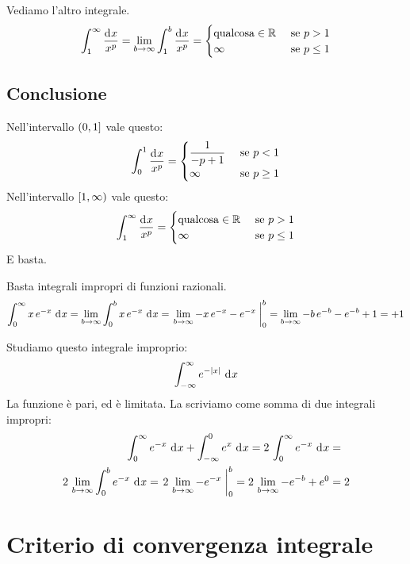 Vediamo l'altro integrale.
\[
\int_{1}^{\infty} \frac{\diff x}{x^p} =
\lim_{b \to \infty} \int_{1}^{b} \frac{\diff x}{x^p} = 
\begin{cases}
\text{qualcosa} \in \reals & \text{ se } p > 1 \\
\infty & \text{ se } p \le 1
\end{cases}
\]

\subsection{Conclusione}

Nell'intervallo $\left( {0}, {1} \right]$ vale questo:
\[
\int_{0}^{1} \frac{\diff x}{x^p} = 
\begin{cases}
\dfrac{1}{- p + 1} & \text{ se } p < 1 \\
\infty & \text{ se } p \ge 1
\end{cases}
\]
Nell'intervallo $\left[ {1}, {\infty} \right)$ vale questo:
\[
\int_{1}^{\infty} \frac{\diff x}{x^p} =
\begin{cases}
\text{qualcosa} \in \reals & \text{ se } p > 1 \\
\infty & \text{ se } p \le 1
\end{cases}
\]
E basta.

\begin{exmp}
Basta integrali impropri di funzioni razionali.
\[
\int_{0}^{\infty} x \, e^{-x} \dx =
\lim_{b \to \infty} \int_{0}^{b} x \, e^{-x} \dx = 
\increment{\lim_{b \to \infty} -x \, e^{-x} - e^{-x}}_{0}^{b} =
\lim_{b \to \infty} -b \, e^{-b} - e^{-b} + 1 = + 1
\]
\end{exmp}

\begin{exmp}
Studiamo questo integrale improprio:
\[
\int_{- \infty}^{\infty} e^{-\abs{x}} \dx
\]
La funzione \`e pari, ed \`e limitata. La scriviamo come somma di due integrali impropri:
\begin{align*}
\int_{0}^{\infty} e^{-x} \dx + \int_{-\infty}^{0} e^{x} \dx =
2 \, \int_{0}^{\infty} e^{-x} \dx &= \\
2 \, \lim_{b \to \infty} \int_{0}^{b} e^{-x} \dx = 
\increment{2 \, \lim_{b \to \infty} - e^{-x}}_{0}^{b} = 
2 \, \lim_{b \to \infty} - e^{-b} + e^{0} &= 2
\end{align*}
\end{exmp}

\newpage
\section{Criterio di convergenza integrale}
\label{sec:criterio_convergenza_integrale}

